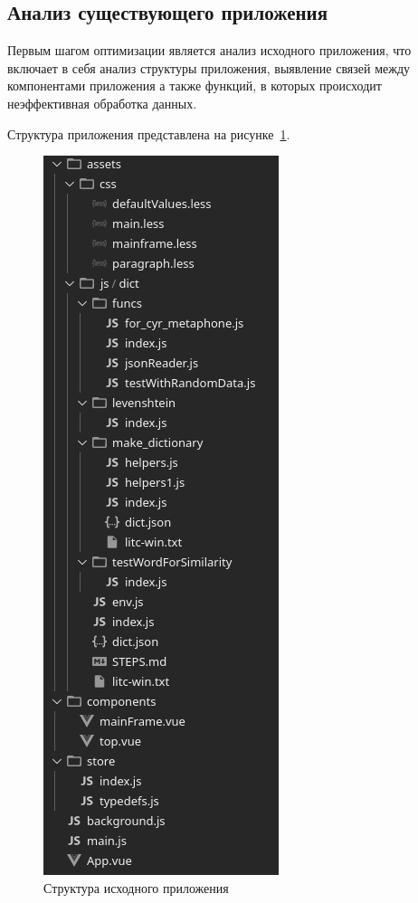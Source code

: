 \subsection{Анализ существующего приложения}

Первым шагом оптимизации является анализ исходного приложения, что включает в себя анализ структуры приложения, выявление связей между компонентами приложения а также функций, в которых происходит неэффективная обработка данных.

Структура приложения представлена на рисунке~\ref{img:oldStruct}.

\begin{figure}[H]
  \centering
  \includegraphics[height=0.4\textheight]{assets/images/practical/oldStructure.png}
  \caption{Структура исходного приложения}
  \label{img:oldStruct}
\end{figure}


